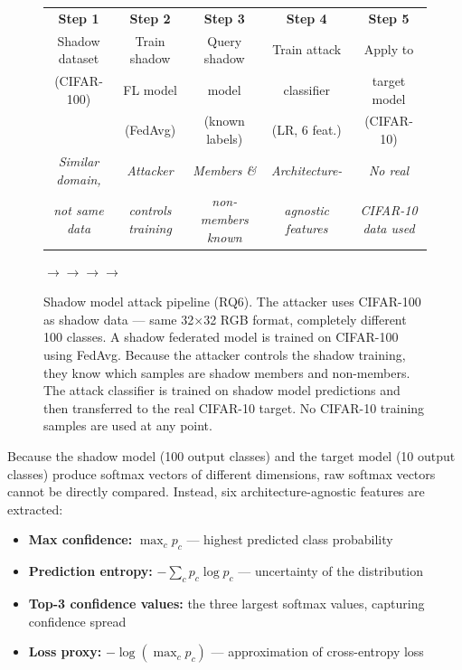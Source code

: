 \documentclass[12pt, a4paper]{report}
\renewcommand{\arraystretch}{1.15}
\begin{document}
\begin{figure}[H]
\centering
\renewcommand{\arraystretch}{1.4}
\begin{tabular}{@{}ccccc@{}}
\hline
\cellcolor{tealcolor!15}\textbf{Step 1} &
\cellcolor{tealcolor!15}\textbf{Step 2} &
\cellcolor{tealcolor!15}\textbf{Step 3} &
\cellcolor{tealcolor!15}\textbf{Step 4} &
\cellcolor{tealcolor!15}\textbf{Step 5} \\[4pt]
Shadow dataset & Train shadow & Query shadow & Train attack & Apply to \\
(CIFAR-100) & FL model & model & classifier & target model \\
& (FedAvg) & (known labels) & (LR, 6 feat.) & (CIFAR-10) \\[4pt]
\scriptsize\textit{Similar domain,} &
\scriptsize\textit{Attacker} &
\scriptsize\textit{Members \&} &
\scriptsize\textit{Architecture-} &
\scriptsize\textit{No real} \\
\scriptsize\textit{not same data} &
\scriptsize\textit{controls training} &
\scriptsize\textit{non-members known} &
\scriptsize\textit{agnostic features} &
\scriptsize\textit{CIFAR-10 data used} \\
\hline
\end{tabular}
\vspace{4pt}

\noindent\hspace{0.5cm}$\longrightarrow$\hspace{1.7cm}$\longrightarrow$\hspace{1.7cm}$\longrightarrow$\hspace{1.7cm}$\longrightarrow$
\caption{Shadow model attack pipeline (RQ6). The attacker uses CIFAR-100 as
shadow data --- same 32$\times$32 RGB format, completely different 100 classes.
A shadow federated model is trained on CIFAR-100 using FedAvg. Because the
attacker controls the shadow training, they know which samples are shadow members
and non-members. The attack classifier is trained on shadow model predictions and
then transferred to the real CIFAR-10 target. No CIFAR-10 training samples are
used at any point.}
\label{fig:shadow_pipeline}
\end{figure}

\noindent Because the shadow model (100 output classes) and the target model (10
output classes) produce softmax vectors of different dimensions, raw softmax
vectors cannot be directly compared. Instead, six architecture-agnostic features
are extracted:

\begin{itemize}[leftmargin=1.5em, itemsep=2pt]
  \item \textbf{Max confidence:} $\max_c p_c$ --- highest predicted class probability
  \item \textbf{Prediction entropy:} $-\sum_c p_c \log p_c$ --- uncertainty of the distribution
  \item \textbf{Top-3 confidence values:} the three largest softmax values, capturing confidence spread
  \item \textbf{Loss proxy:} $-\log(\max_c p_c)$ --- approximation of cross-entropy loss
\end{itemize}
\end{document}
